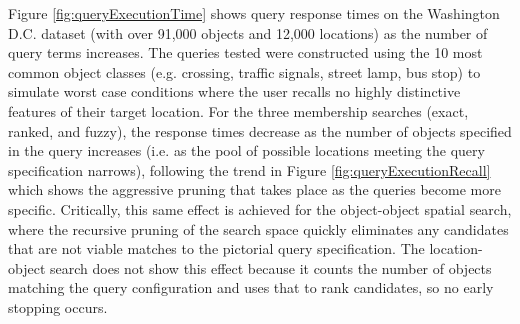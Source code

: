Figure \ref{fig:queryExecutionTime} shows query response times on the Washington D.C. dataset (with over 91,000 objects and 12,000 locations) as the number of query terms increases. 
The queries tested were constructed using the 10 most common object classes (e.g. crossing, traffic signals, street lamp, bus stop) to simulate worst case conditions where the user recalls no highly distinctive features of their target location.
For the three membership searches (exact, ranked, and fuzzy), the response times decrease as the number of objects specified in the query increases (i.e. as the pool of possible locations meeting the query specification narrows), following the trend in Figure \ref{fig:queryExecutionRecall} which shows the aggressive pruning that takes place as the queries become more specific.
Critically, this same effect is achieved for the object-object spatial search, where the recursive pruning of the search space quickly eliminates any candidates that are not viable matches to the pictorial query specification.
The location-object search does not show this effect because it counts the number of objects matching the query configuration and uses that to rank candidates, so no early stopping occurs. %






